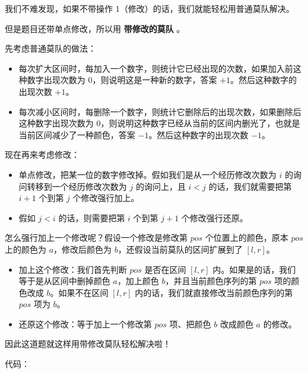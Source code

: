 我们不难发现，如果不带操作 1（修改）的话，我们就能轻松用普通莫队解决。

但是题目还带单点修改，所以用 \textbf{ 带修改的莫队 }。

先考虑普通莫队的做法：

\begin{itemize}
\item 每次扩大区间时，每加入一个数字，则统计它已经出现的次数，如果加入前这种数字出现次数为 $0$，则说明这是一种新的数字，答案 $+1$。然后这种数字的出现次数 $+1$。
\item 每次减小区间时，每删除一个数字，则统计它删除后的出现次数，如果删除后这种数字出现次数为 $0$，则说明这种数字已经从当前的区间内删光了，也就是当前区间减少了一种颜色，答案 $-1$。然后这种数字的出现次数 $-1$。
\end{itemize}

现在再来考虑修改：

\begin{itemize}
\item 单点修改，把某一位的数字修改掉。假如我们是从一个经历修改次数为 $i$ 的询问转移到一个经历修改次数为 $j$ 的询问上，且 $i<j$ 的话，我们就需要把第 $i+1$ 个到第 $j$ 个修改强行加上。
\item 假如 $j<i$ 的话，则需要把第 $i$ 个到第 $j+1$ 个修改强行还原。
\end{itemize}

怎么强行加上一个修改呢？假设一个修改是修改第 $pos$ 个位置上的颜色，原本 $pos$ 上的颜色为 $a$，修改后颜色为 $b$，还假设当前莫队的区间扩展到了 $[l,r]$。

\begin{itemize}
\item 加上这个修改：我们首先判断 $pos$ 是否在区间 $[l,r]$ 内。如果是的话，我们等于是从区间中删掉颜色 $a$，加上颜色 $b$，并且当前颜色序列的第 $pos$ 项的颜色改成 $b$。如果不在区间 $[l,r]$ 内的话，我们就直接修改当前颜色序列的第 $pos$ 项为 $b$。
\item 还原这个修改：等于加上一个修改第 $pos$ 项、把颜色 $b$ 改成颜色 $a$ 的修改。
\end{itemize}

因此这道题就这样用带修改莫队轻松解决啦！

代码：

